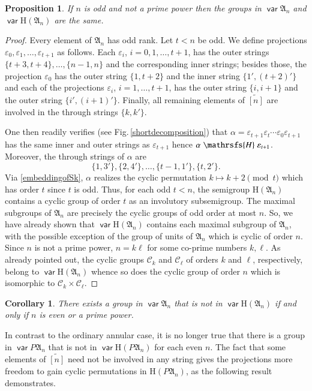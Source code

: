 \documentclass[preprint,1p,times]{elsarticle}
\DeclareMathOperator{\var}{\mathsf{var}}
\numberwithin{equation}{section}
\newtheorem{Prop}[Thm]{Proposition}
\newtheorem{Cor}[Thm]{Corollary}
\theoremstyle{remark}
\def\Hc{\mathrsfs{H}}
\def\al{\alpha}
\def\ep{\varepsilon}
\def\H{\mathrm H}
\def\A{\mathfrak{A}}
\def\wt{\widetilde}
\begin{document}
\begin{Prop}
\label{noprimepowerodd} If $n$ is odd and not a prime power then the groups in $\var\A_n$ and $\var\H(\A_n)$ are the
same.
\end{Prop}
\begin{proof} Every element of $\A_n$ has odd rank. Let $t<n$ be odd.
We define projections $\ep_0,\ep_1,\dots,\ep_{t+1}$ as follows. Each $\ep_i$, $i=0,1,\dots,t+1$, has the outer strings
$\{t+3,t+4\},\dots,\{n-1,n\}$ and the corresponding inner strings; besides those, the projection $\ep_0$ has the outer
string $\{1,t+2\}$ and the inner string $\{1',(t+2)'\}$ and each of the projections $\ep_i$, $i=1,\dots,t+1$, has the
outer string $\{i,i+1\}$ and the outer string $\{i',(i+1)'\}$. Finally, all remaining elements of $\wt{[n]}$ are
involved in the through strings  $\{k,k'\}$.

One then readily verifies (see Fig.\,\ref{shortdecomposition}) that $\al=\ep_{t+1}\ep_t\cdots \ep_0\ep_{t+1}$ has the
same inner and outer strings as $\ep_{t+1}$ hence $\al\mathrel{\Hc}\ep_{t+1}$. Moreover, the through strings of $\al$
are
$$\{1,3'\},\{2,4'\},\dots,\{t-1,1'\},\{t,2'\}.$$
Via \eqref{embeddingofSk}, $\al$ realizes the cyclic permutation $k\mapsto k+2\!\pmod{t}$ which has order $t$ since $t$
is odd. Thus, for each odd $t<n$, the semigroup $\H(\A_n)$ contains a cyclic group of order $t$ as an involutory subsemigroup.
The maximal subgroups of $\A_n$ are precisely the cyclic groups of odd order at most $n$. So, we have already shown
that $\var\H(\A_n)$ contains each maximal subgroup of $\A_n$, with the possible exception of the group of units of
$\A_n$ which is cyclic of order $n$. Since $n$ is not a prime power, $n=k\ell$ for some co-prime numbers $k,\ell$. As
already pointed out, the cyclic groups $\mathcal{C}_k$ and $\mathcal{C}_\ell$ of orders $k$ and $\ell$, respectively,
belong to $\var\H(\A_n)$ whence so does the cyclic group of order $n$ which is isomorphic to $\mathcal{C}_k
\times\mathcal{C}_\ell$.
\end{proof}
\begin{Cor} There exists a group in $\var\A_n$ that is not in
$\var\H(\A_n)$ if and only if $n$ is even or a prime power.
\end{Cor}


In contrast to the ordinary annular case, it is no longer true that there is a group in $\var P\A_n$ that is not in
$\var\H(P\A_n)$ for each even $n$. The fact that some elements of $\wt{[n]}$ need not be involved in any string gives
the projections more freedom to gain cyclic permutations in $\H(P\A_n)$, as the following result demonstrates.
\end{document}
